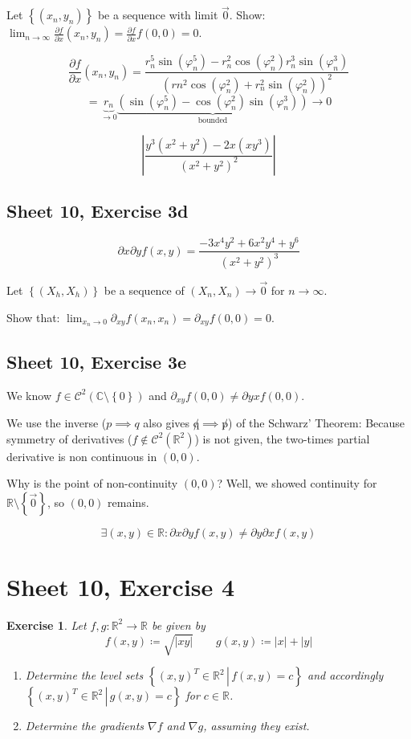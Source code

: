 \documentclass{article}
\newtheorem{ex}{Exercise} %
\newcommand{\set}[1]{\left\{#1\right\}}
\newcommand{\setdef}[2]{\left\{\left.#1\,\right|\,#2\right\}}
\newcommand{\card}[1]{\left|#1\right|}
\begin{document}
Let $\set{(x_n, y_n)}$ be a sequence with limit $\vec 0$.
Show: $\lim_{n\to\infty} \frac{\partial f}{\partial x} (x_n, y_n) = \frac{\partial f}{\partial x} f(0, 0) = 0$.

\[ \frac{\partial f}{\partial x} (x_n, y_n) = \frac{r_n^5 \sin(\varphi_n^5) - r_n^2 \cos(\varphi_n^2) r_n^3 \sin(\varphi_n^3)}{(rn^2 \cos(\varphi_n^2) + r_n^2 \sin(\varphi_n^2))^2} \]
\[ = \underbrace{r_n}_{\to 0} \underbrace{(\sin(\varphi_n^5) - \cos(\varphi_n^2) \sin(\varphi_n^3))}_{\text{bounded}} \to 0 \]

\[ \card{\frac{y^3 (x^2 + y^2) - 2x (xy^3)}{(x^2 + y^2)^2}} \]

\subsection{Sheet 10, Exercise 3d}
\[ \partial x \partial y f(x, y) = \frac{-3x^4 y^2 + 6x^2 y^4 + y^6}{(x^2 + y^2)^3} \]

Let $\set{(X_h, X_h)}$ be a sequence of $(X_n, X_n) \to \vec 0$ for $n \to \infty$.

Show that: $\lim_{x_n \to 0} \partial_{xy} f(x_n, x_n) = \partial_{xy} f(0, 0) = 0$.

\subsection{Sheet 10, Exercise 3e}
We know $f \in \mathcal C^2(\mathbb C \setminus \set{0})$ and $\partial_{xy} f(0, 0) \neq \partial yx f(0, 0)$.


We use the inverse ($p \implies q$ also gives $\not q \implies \not p$) of the Schwarz' Theorem: Because symmetry of derivatives ($f \not\in \mathcal C^2(\mathbb R^2)$) is not given, the two-times partial derivative is non continuous in $(0, 0)$.

Why is the point of non-continuity $(0, 0)$? Well, we showed continuity for $\mathbb R \setminus \set{\vec 0}$, so $(0, 0)$ remains.

\[ \exists (x, y) \in \mathbb R: \partial x \partial y f(x, y) \neq \partial y \partial x f(x, y) \]

\section{Sheet 10, Exercise 4}
\begin{ex}
  Let $f, g: \mathbb R^2 \to \mathbb R$ be given by
  \[ f(x, y) \coloneqq \sqrt{\card{xy}} \qquad g(x, y) \coloneqq \card{x} + \card{y} \]
  \begin{enumerate}
    \item Determine the level sets $\setdef{(x, y)^T \in \mathbb R^2}{f(x, y) = c}$ and accordingly $\setdef{(x, y)^T \in \mathbb R^2}{g(x, y) = c}$ for $c \in \mathbb R$.
    \item Determine the gradients $\nabla f$ and $\nabla g$, assuming they exist.
  \end{enumerate}
\end{ex}
\end{document}
